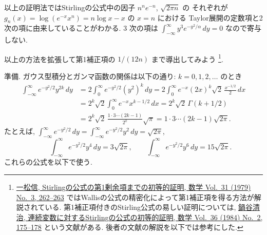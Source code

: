 \documentclass[12pt,twoside]{jarticle}
\theoremstyle{jplain}
\theoremstyle{jplain}
\theoremstyle{jplain}
\numberwithin{theorem}{section}
\numberwithin{equation}{section}
\numberwithin{figure}{section}
\numberwithin{table}{section}
\begin{document}
以上の証明法ではStirlingの公式中の因子 $n^n e^{-n}$, $\sqrt{2\pi n}$ の
それぞれが $g_n(x)=\log(e^{-x}x^n)=n\log x-x$ の $x=n$ における
Taylor展開の定数項と2次の項に由来していることがわかる.
$3$ 次の項は $\int_{-\infty}^\infty y^3 e^{-y^2/\alpha}\,dy=0$ 
なので寄与しない.  

以上の方法を拡張して第1補正項の $1/(12n)$ まで導出してみよう%
\footnote{%
\href{https://www.jstage.jst.go.jp/article/sugaku1947/31/3/31_3_262/_article/references/-char/ja/}
{一松信, Stirlingの公式の第1剰余項までの初等的証明, 
数学 Vol.~31 (1979) No.~3, 262--263}
ではWallisの公式の精密化によって第1補正項を得る方法が解説されている.
第1補正項付きのStirling公式の易しい証明については, 
\href{https://www.jstage.jst.go.jp/article/sugaku1947/36/2/36_2_175/_article/references/-char/ja/}
{鍋谷清治, 連続変数に対するStirlingの公式の初等的証明, 
数学 Vol.~36 (1984) No.~2, 175--178}
という文献がある. 後者の文献の解説を以下では参考にした.}.

準備. ガウス型積分とガンマ函数の関係は以下の通り: $k=0,1,2,\ldots$ のとき
\begin{align*}
\int_{-\infty}^\infty e^{-y^2/2}y^{2k}\,dy
&=2\int_0^\infty e^{-y^2/2} (y^2)^k \,dy
=2\int_0^\infty e^{-x} (2x)^k \sqrt{2}\,\frac{x^{-1/2}}{2}\,dx
\\ &
=2^k\sqrt{2}\int_0^\infty e^{-x} x^{k-1/2}\,dx
=2^k\sqrt{2}\,\Gamma(k+1/2)
\\ &
=2^k\sqrt{2}\,\frac{1\cdot3\cdots(2k-1)}{2^k}\sqrt{\pi}
=1\cdot3\cdots(2k-1)\sqrt{2\pi}.
\end{align*}
たとえば, 
\(
\int_{-\infty}^\infty e^{-y^2/2}\,dy
=\int_{-\infty}^\infty e^{-y^2/2}y^2\,dy
=\sqrt{2\pi}
\),
\[
\qquad
\int_{-\infty}^\infty e^{-y^2/2}y^4\,dy = 3\sqrt{2\pi}, \qquad
\int_{-\infty}^\infty e^{-y^2/2}y^6\,dy = 15\sqrt{2\pi}.
\]
これらの公式を以下で使う.
\end{document}
